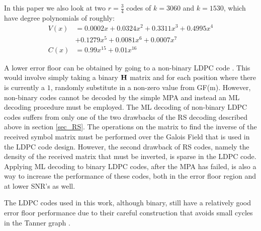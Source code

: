 \documentclass[conference]{IEEEtran}
\begin{document}
In this paper we also look at two $r=\frac{3}{4}$ codes of $k=3060$ and $k=1530$, which have degree polynomials of roughly:
\begin{align*}
  V(x) &= 0.0002x + 0.0324x^2 + 0.3311x^3 + 0.4995x^4 \\
       & + 0.1279x^5 + 0.0081x^6  + 0.0007x^7 \\
  C(x) &= 0.99x^{15} + 0.01x^{16}
\end{align*}

A lower error floor can be obtained by going to a non-binary LDPC code \cite{Garrammone_NonbinaryLDPC-10}.  This would involve simply taking a binary $\bf{H}$ matrix and for each position where there is currently a $1$, randomly substitute in a non-zero value from GF(m).  However, non-binary codes cannot be decoded by the simple MPA and instead an ML decoding procedure must be employed.  The ML decoding of non-binary LDPC codes suffers from only one of the two drawbacks of the RS decoding described above in section \ref{sec_RS}.  The operations  on the matrix to find the inverse of the received symbol matrix must be performed over the Galois Field that is used in the LDPC code design.  However, the second drawback of RS codes, namely the density of the received matrix that must be inverted, is sparse in the LDPC code.  Applying ML decoding to binary LDPC codes, after the MPA has failed, is also a way to increase the performance of these codes, both in the error floor region and at lower SNR's as well.

The LDPC codes used in this work, although binary, still have a relatively good error floor performance due to their careful construction that avoids small cycles in the Tanner graph \cite{tanner-01}.  
\end{document}
